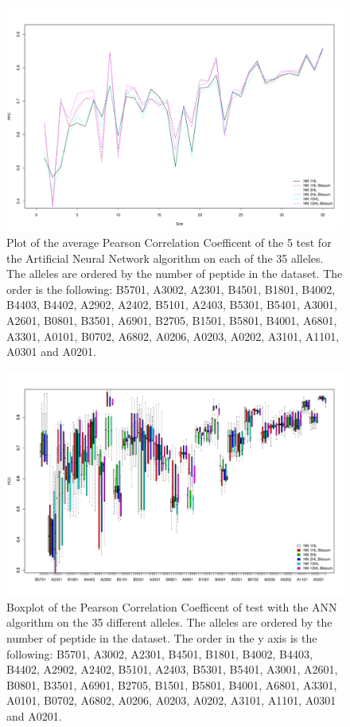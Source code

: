 \begin{figure}[ht]
\begin{center}
\includegraphics[width=18cm]{fig/annLNzoom.pdf}
\caption{Plot of the average Pearson Correlation Coefficent of the 5 test for the Artificial Neural Network algorithm on each of the 35 alleles. The alleles are ordered by the number of peptide in the dataset. The order is the following:
B5701, A3002, A2301, B4501, B1801, B4002, B4403, B4402, A2902, A2402, B5101, A2403, B5301, B5401, A3001, A2601, B0801, B3501, A6901, B2705, B1501, B5801, B4001, A6801, A3301, A0101, B0702, A6802, A0206, A0203, A0202, A3101, A1101, A0301 and A0201.}\label{fig:ann1}
\end{center}
\end{figure}

\begin{figure}[ht]
\begin{center}
\includegraphics[width=18cm]{fig/annBX1.pdf}
\caption{Boxplot of the Pearson Correlation Coefficent of test with the ANN algorithm on the 35 different alleles. The alleles are ordered by the number of peptide in the dataset. The order in the y axis is the following:
B5701, A3002, A2301, B4501, B1801, B4002, B4403, B4402, A2902, A2402, B5101, A2403, B5301, B5401, A3001, A2601, B0801, B3501, A6901, B2705, B1501, B5801, B4001, A6801, A3301, A0101, B0702, A6802, A0206, A0203, A0202, A3101, A1101, A0301 and A0201.}\label{fig:ann2}
\end{center}
\end{figure}
